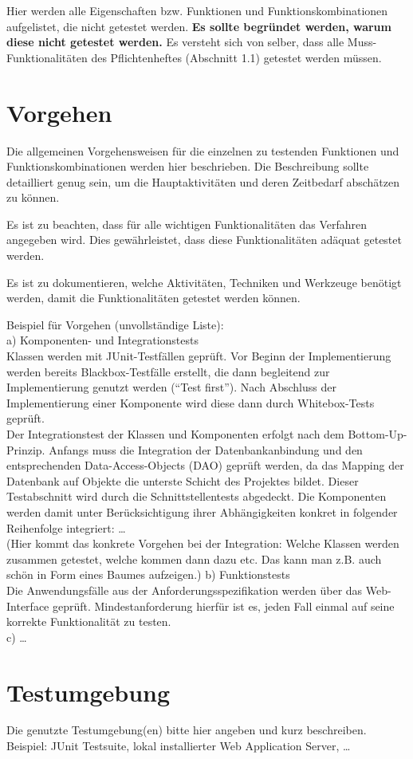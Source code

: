 Hier werden alle Eigenschaften bzw. Funktionen und Funktionskombinationen
aufgelistet, die nicht getestet werden.
\textbf{ Es sollte begr\"undet werden, warum diese nicht getestet werden.} Es
versteht sich von selber, dass alle Muss-Funktionalit\"aten des Pflichtenheftes
(Abschnitt 1.1) getestet werden m\"ussen.

\section{Vorgehen}
Die allgemeinen Vorgehensweisen f\"ur die einzelnen zu testenden Funktionen und
Funktionskombinationen werden hier beschrieben. Die Beschreibung sollte
detailliert genug sein, um die Hauptaktivit\"aten und deren Zeitbedarf absch\"atzen
zu k\"onnen.

Es ist zu beachten, dass f\"ur alle wichtigen Funktionalit\"aten das Verfahren
angegeben wird. Dies gew\"ahrleistet, dass diese Funktionalit\"aten ad\"aquat
getestet werden.

Es ist zu dokumentieren, welche Aktivit\"aten, Techniken und Werkzeuge ben\"otigt
werden, damit die Funktionalit\"aten getestet werden k\"onnen.

Beispiel f\"ur Vorgehen (unvollst\"andige Liste):\\
a) Komponenten- und Integrationstests\\
Klassen werden mit JUnit-Testf\"allen gepr\"uft. Vor Beginn der Implementierung
werden bereits Blackbox-Testf\"alle erstellt, die dann begleitend zur
Implementierung genutzt werden ("`Test first"'). Nach Abschluss der
Implementierung einer Komponente wird diese dann durch Whitebox-Tests
gepr\"uft.\\
Der Integrationstest der Klassen und Komponenten erfolgt nach dem
Bottom-Up-Prinzip. Anfangs muss die Integration der Datenbankanbindung und den
entsprechenden Data-Access-Objects (DAO) gepr\"uft werden, da das Mapping der
Datenbank auf Objekte die unterste Schicht des Projektes bildet. Dieser
Testabschnitt wird durch die Schnittstellentests abgedeckt.
Die Komponenten werden damit unter Ber\"ucksichtigung ihrer Abh\"angigkeiten
konkret in folgender Reihenfolge integriert: \ldots\\
(Hier kommt das konkrete Vorgehen bei der Integration: Welche Klassen werden
zusammen getestet, welche kommen dann dazu etc. Das kann man z.B. auch sch\"on in
Form eines Baumes aufzeigen.)
b) Funktionstests\\
Die Anwendungsf\"alle aus der Anforderungsspezifikation werden \"uber das
Web-Interface gepr\"uft. Mindestanforderung hierf\"ur ist es, jeden Fall einmal auf
seine korrekte Funktionalit\"at zu testen.\\
c) \ldots

\section{Testumgebung}
Die genutzte Testumgebung(en) bitte hier angeben und kurz beschreiben.\\
Beispiel: JUnit Testsuite, lokal installierter Web Application Server, \ldots


